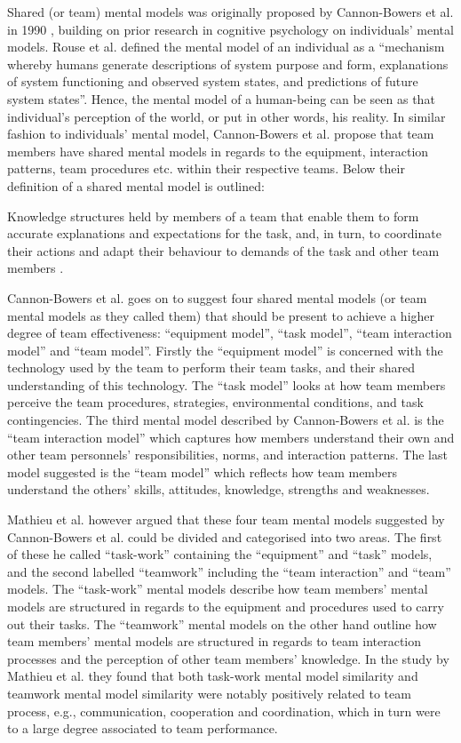 Shared (or team) mental models was originally proposed by Cannon-Bowers et al. in 1990 \cite{}, building on prior research in cognitive psychology on individuals’ mental models. Rouse et al. \cite{} defined the mental model of an individual as a ``mechanism whereby humans generate descriptions of system purpose and form, explanations of system functioning and observed system states, and predictions of future system states''. Hence, the mental model of a human-being can be seen as that individual's perception of the world, or put in other words, his reality. In similar fashion to individuals' mental model, Cannon-Bowers et al. propose that team members have shared mental models in regards to the equipment, interaction patterns, team procedures etc. within their respective teams. Below their definition of a shared mental model is outlined:

\begin{fancyquotes}
Knowledge structures held by members of a team that enable them to form accurate explanations and expectations for the task, and, in turn, to coordinate their actions and adapt their behaviour to demands of the task and other team members \cite{}.
\end{fancyquotes}

Cannon-Bowers et al. \cite{} goes on to suggest four shared mental models (or team mental models as they called them) that should be present to achieve a higher degree of team effectiveness: ``equipment model'', ``task model'', ``team interaction model'' and ``team model''. Firstly the ``equipment model'' is concerned with the technology used by the team to perform their team tasks, and their shared understanding of this technology. The ``task model'' looks at how team members perceive the team procedures, strategies, environmental conditions, and task contingencies. The third mental model described by Cannon-Bowers et al. is the ``team interaction model'' which captures how members understand their own and other team personnels' responsibilities, norms, and interaction patterns. The last model suggested is the ``team model'' which reflects how team members understand the others' skills, attitudes, knowledge, strengths and weaknesses.

Mathieu et al. \cite{} however argued that these four team mental models suggested by Cannon-Bowers et al. \cite{} could be divided and categorised into two areas. The first of these he called ``task-work'' containing the ``equipment'' and ``task'' models, and the second labelled ``teamwork'' including the ``team interaction'' and ``team'' models. The ``task-work'' mental models describe how team members' mental models are structured in regards to the equipment and procedures used to carry out their tasks. The ``teamwork'' mental models on the other hand outline how team members' mental models are structured in regards to team interaction processes and the perception of other team members' knowledge. In the study by Mathieu et al. \cite{} they found that both task-work mental model similarity and teamwork mental model similarity were notably positively related to team process, e.g., communication, cooperation and coordination, which in turn were to a large degree associated to team performance.

